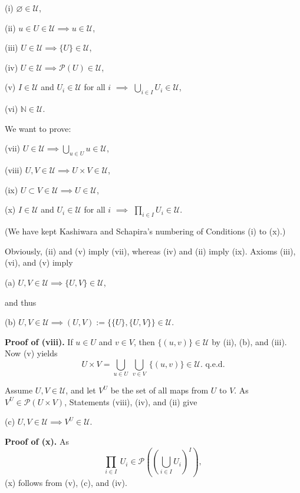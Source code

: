 \documentclass[12pt]{article}
\theoremstyle{remark}%
\newcommand{\n}{\noindent}
\begin{document}
(i) $\varnothing\in\mathcal U$,

(ii) $u\in U\in\mathcal U\implies u\in \mathcal U$,

(iii) $U\in\mathcal U\implies\{U\}\in\mathcal U$,

(iv) $U\in\mathcal U\implies\mathcal P(U)\in\mathcal U$,

(v) $I\in\mathcal U$ and $U_i\in\mathcal U$ for all $i$ $\implies$ $\bigcup_{i\in I}U_i\in\mathcal U$,

(vi) $\mathbb N\in\mathcal U$.

\n We want to prove:

(vii) $U\in\mathcal U\implies\bigcup_{u\in U}u\in\mathcal U$,

(viii) $U,V\in\mathcal U\implies U\times V\in\mathcal U$,

(ix) $U\subset V\in\mathcal U\implies U\in\mathcal U$,

(x) $I\in \mathcal U$ and $U_i\in\mathcal U$ for all $i$ $\implies$ $\prod_{i\in I}U_i\in\mathcal U$.

\n(We have kept Kashiwara and Schapira's numbering of Conditions (i) to (x).) 

\n Obviously, (ii) and (v) imply (vii), whereas (iv) and (ii) imply (ix). Axioms (iii), (vi), and (v) imply

(a) $U,V\in\mathcal U\implies\{U,V\}\in\mathcal U$,

\n and thus

(b) $U,V\in\mathcal U\implies(U,V):=\{\{U\},\{U,V\}\}\in\mathcal U$.

\n\textbf{Proof of (viii).} If $u\in U$ and $v\in V$, then $\{(u,v)\}\in\mathcal U$ by (ii), (b), and (iii). Now (v) yields 
$$
U\times V=\bigcup_{u\in U}\ \bigcup_{v\in V}\ \{(u,v)\}\in\mathcal U.\text{ q.e.d.} 
$$ 

Assume $U,V\in\mathcal U$, and let $V^U$ be the set of all maps from $U$ to $V$. As $V^U\in\mathcal P(U\times V)$, Statements (viii), (iv), and (ii) give

(c) $U,V\in\mathcal U\implies V^U\in\mathcal U$. 

\n\textbf{Proof of (x).} As 
$$
\prod_{i\in I}\ U_i\in\mathcal P\left(\left(\bigcup_{i\in I}U_i\right)^I\right),
$$
(x) follows from (v), (c), and (iv). 
%
\end{document}
